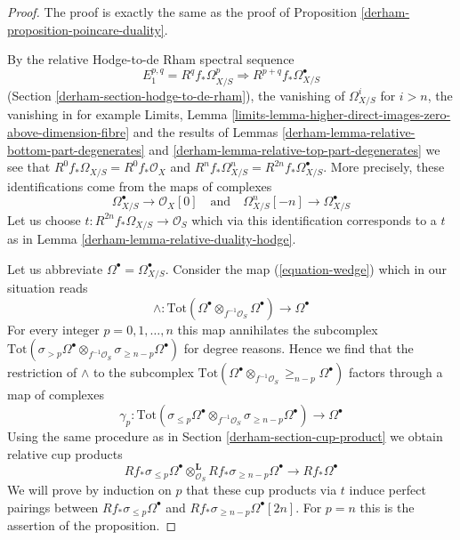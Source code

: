 \begin{proof}

The proof is exactly the same as the proof of
Proposition \ref{derham-proposition-poincare-duality}.

\medskip\noindent
By the relative Hodge-to-de Rham spectral sequence
$$
E_1^{p, q} = R^qf_*\Omega^p_{X/S} \Rightarrow R^{p + q}f_*\Omega^\bullet_{X/S}
$$
(Section \ref{derham-section-hodge-to-de-rham}), the vanishing
of $\Omega^i_{X/S}$ for $i > n$, the vanishing in for example Limits, Lemma
\ref{limits-lemma-higher-direct-images-zero-above-dimension-fibre}
and the results of Lemmas \ref{derham-lemma-relative-bottom-part-degenerates} and
\ref{derham-lemma-relative-top-part-degenerates}
we see that $R^0f_*\Omega_{X/S} = R^0f_*\mathcal{O}_X$
and $R^nf_*\Omega^n_{X/S} = R^{2n}f_*\Omega^\bullet_{X/S}$.
More precisely, these identifications come from the maps
of complexes
$$
\Omega^\bullet_{X/S} \to \mathcal{O}_X[0]
\quad\text{and}\quad
\Omega^n_{X/S}[-n] \to \Omega^\bullet_{X/S}
$$
Let us choose $t : R^{2n}f_*\Omega_{X/S} \to \mathcal{O}_S$
which via this identification corresponds to a $t$ as in
Lemma \ref{derham-lemma-relative-duality-hodge}.

\medskip\noindent
Let us abbreviate $\Omega^\bullet = \Omega^\bullet_{X/S}$.
Consider the map (\ref{equation-wedge}) which in our situation reads
$$
\wedge :
\text{Tot}(\Omega^\bullet \otimes_{f^{-1}\mathcal{O}_S} \Omega^\bullet)
\longrightarrow
\Omega^\bullet
$$
For every integer $p = 0, 1, \ldots, n$ this map annihilates the subcomplex
$\text{Tot}(\sigma_{> p} \Omega^\bullet \otimes_{f^{-1}\mathcal{O}_S}
\sigma_{\geq n - p} \Omega^\bullet)$ for degree reasons.
Hence we find that the restriction of $\wedge$ to the subcomplex
$\text{Tot}(\Omega^\bullet \otimes_{f^{-1}\mathcal{O}_S}
\geq_{n - p}\Omega^\bullet)$ factors through a map of complexes
$$
\gamma_p :
\text{Tot}(\sigma_{\leq p} \Omega^\bullet \otimes_{f^{-1}\mathcal{O}_S}
\sigma_{\geq n - p} \Omega^\bullet)
\longrightarrow
\Omega^\bullet
$$
Using the same procedure as in Section \ref{derham-section-cup-product} we obtain
relative cup products
$$
Rf_*\sigma_{\leq p} \Omega^\bullet
\otimes_{\mathcal{O}_S}^\mathbf{L}
Rf_*\sigma_{\geq n - p}\Omega^\bullet
\longrightarrow
Rf_*\Omega^\bullet
$$
We will prove by induction on $p$ that these cup products via $t$
induce perfect pairings between $Rf_*\sigma_{\leq p} \Omega^\bullet$
and $Rf_*\sigma_{\geq n - p}\Omega^\bullet[2n]$. For $p = n$
this is the assertion of the proposition.


\end{proof}
